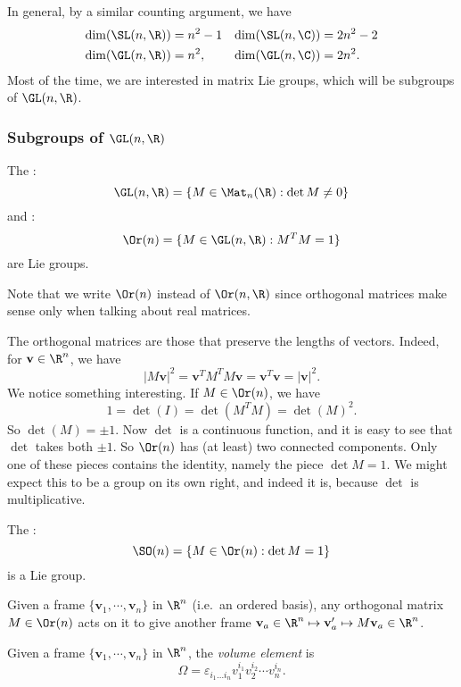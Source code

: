 \documentclass[a4paper]{article}
\begin{document}
In general, by a similar counting argument, we have
\begin{align*}
  \dim (\SL(n, \R)) &= n^2 - 1& \dim (\SL(n, \C)) &= 2n^2 - 2\\
  \dim (\GL(n, \R)) &= n^2,& \dim(\GL(n, \C)) &= 2n^2.
\end{align*}
Most of the time, we are interested in matrix Lie groups, which will be subgroups of $\GL(n, \R)$.

\subsubsection*{Subgroups of \texorpdfstring{$\GL(n, \R)$}{GL(n, R)}}
\begin{lemma}
  The :
  \[
    \GL(n, \R) = \{M \in \Mat_n(\R): \det M \not= 0\}
  \]
  and :
  \[
    \Or(n) = \{M \in \GL(n, \R): M^TM = 1\}
  \]
  are Lie groups.
\end{lemma}
Note that we write $\Or(n)$ instead of $\Or(n, \R)$ since orthogonal matrices make sense only when talking about real matrices.

The orthogonal matrices are those that preserve the lengths of vectors. Indeed, for $\mathbf{v}\in \R^n$, we have
\[
  |M\mathbf{v}|^2 = \mathbf{v}^T M^T M \mathbf{v} = \mathbf{v}^T \mathbf{v} = |\mathbf{v}|^2.
\]
We notice something interesting. If $M \in \Or(n)$, we have
\[
  1 = \det(I) = \det(M^TM) = \det(M)^2.
\]
So $\det(M) = \pm 1$. Now $\det$ is a continuous function, and it is easy to see that $\det$ takes both $\pm 1$. So $\Or(n)$ has (at least) two connected components. Only one of these pieces contains the identity, namely the piece $\det M = 1$. We might expect this to be a group on its own right, and indeed it is, because $\det$ is multiplicative.
\begin{lemma}
  The  :
  \[
    \SO(n) = \{M \in \Or(n): \det M = 1\}
  \]
  is a Lie group.
\end{lemma}

Given a frame $\{\mathbf{v}_1, \cdots, \mathbf{v}_n\}$ in $\R^n$ (i.e.\ an ordered basis), any orthogonal matrix $M \in \Or(n)$ acts on it to give another frame $\mathbf{v}_a \in \R^n \mapsto \mathbf{v}_a' \mapsto M\mathbf{v}_a \in \R^n$.
\begin{defi}
  Given a frame $\{\mathbf{v}_1, \cdots, \mathbf{v}_n\}$ in $\R^n$, the \emph{volume element} is
  \[
    \Omega = \varepsilon_{i_1 \ldots i_n} v_1^{i_1} v_2^{i_2} \cdots v_n^{i_n}.
  \]
\end{defi}
\end{document}
